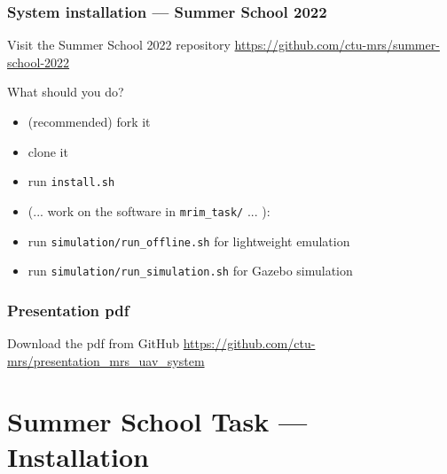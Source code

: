 \documentclass[aspectratio=169]{beamer}
\begin{document}
\begin{frame}
\frametitle{System installation --- Summer School 2022}

\begin{block}{Visit the Summer School 2022 repository}
  \centering
  \Large\url{https://github.com/ctu-mrs/summer-school-2022}
\end{block}

\begin{block}{What should you do?}
  \begin{itemize}
    \item (recommended) fork it
    \item clone it
    \item run \texttt{install.sh}
    \item (... work on the software in \texttt{mrim\_task/} ... ):
    \item run \texttt{simulation/run\_offline.sh} for lightweight emulation
    \item run \texttt{simulation/run\_simulation.sh} for Gazebo simulation
  \end{itemize}
\end{block}

\end{frame}



\begin{frame}
\frametitle{Presentation pdf}

\begin{block}{Download the pdf from GitHub}
  \centering
  \Large\url{https://github.com/ctu-mrs/presentation_mrs_uav_system}
\end{block}

\end{frame}


\section{Summer School Task --- Installation}

\end{document}

